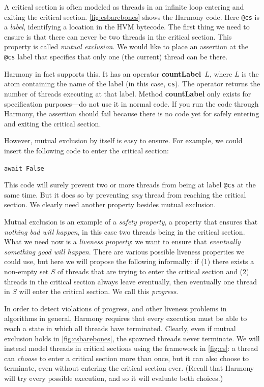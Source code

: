 \documentclass{report}
\newenvironment{code}{
\tcolorbox
}{
\endtcolorbox
}
\begin{document}
%

A critical section is often modeled as threads in an infinite loop
entering and exiting the critical section.
\autoref{fig:csbarebones} shows the Harmony code.
Here \texttt{@cs} is a \emph{label},
%
identifying a location in the HVM bytecode.  The first thing we need to
ensure is that there can never be two threads in the critical section.
This property is called \emph{mutual exclusion}.
%
We would like to place an assertion at the \texttt{@cs} label that
specifies that only one (the current) thread can be there.

Harmony in fact supports this.
It has an operator \textbf{countLabel}~$L$,
%
where $L$
is the atom containing the name of the label (in this case, \texttt{cs}).
The operator returns the number of threads executing at that label.
Method \textbf{countLabel} only exists for specification purposes---do not
use it in normal code.
If you run the code through Harmony, the assertion should fail because
there is no code yet for safely entering and exiting the critical section.

However, mutual exclusion by itself is easy to ensure.
For example, we could insert the following code to enter the
critical section:
\begin{code}
\texttt{await False}
\end{code}
This code will surely prevent two or more threads from being
at label \texttt{@cs} at the same time.
But it does so by preventing \emph{any} thread from reaching
the critical section.
We clearly need another property besides mutual exclusion.

Mutual exclusion is an example of a \emph{safety property},
%
a property that ensures that \emph{nothing bad will happen}, in this case
two threads being in the critical section.
What we need now is a \emph{liveness property}:
%
we want to ensure that
\emph{eventually something good will happen}.
There are various possible liveness properties we could use,
but here we will propose the following informally: if
(1) there exists a non-empty
set $S$ of threads that are trying to enter the critical section and
(2) threads in the critical section always leave eventually, then
eventually one thread in $S$ will enter the critical section.
We call this \emph{progress}.
%

In order to detect violations of progress, and other liveness problems in
algorithms in general, Harmony requires that every execution must be
able to reach a state in which all threads have terminated.
Clearly, even if mutual exclusion holds in \autoref{fig:csbarebones},
the spawned threads never terminate.  We
will instead model threads in critical sections using the framework in
\autoref{fig:cs}: a thread can \emph{choose} to enter a
critical section more than once, but it can also choose to terminate, even
without entering the critical section ever.
(Recall that Harmony will try every possible execution, and so it will evaluate
both choices.)
\end{document}
